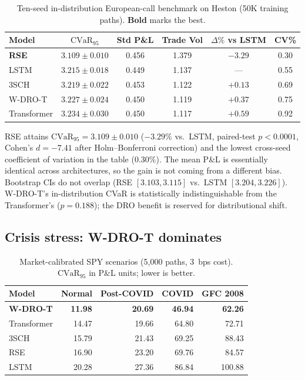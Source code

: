 \documentclass[11pt]{article}
\newcommand{\cvar}{\mathrm{CVaR}}
\begin{document}
\begin{table}[ht]\centering\small
\caption{Ten-seed in-distribution European-call benchmark on Heston (50K training paths). \textbf{Bold} marks the best.}
\label{tab:main}
\begin{tabular}{@{}lccccc@{}}
\toprule
\textbf{Model} & \textbf{$\cvar_{95}$} & \textbf{Std P\&L} & \textbf{Trade Vol} & \textbf{$\Delta\%$ vs LSTM} & \textbf{CV\%} \\\midrule
\textbf{RSE} & $\mathbf{3.109\pm 0.010}$ & 0.456 & 1.379 & $\mathbf{-3.29}$ & $\mathbf{0.30}$ \\
LSTM & $3.215\pm 0.018$ & 0.449 & 1.137 & --- & 0.55 \\
3SCH & $3.219\pm 0.022$ & 0.453 & 1.122 & $+0.13$ & 0.69 \\
W-DRO-T & $3.227\pm 0.024$ & 0.450 & 1.119 & $+0.37$ & 0.75 \\
Transformer & $3.234\pm 0.030$ & 0.450 & 1.117 & $+0.59$ & 0.92 \\
\bottomrule
\end{tabular}
\end{table}

RSE attains $\cvar_{95}=3.109\pm 0.010$ ($-3.29\%$ vs.\ LSTM, paired-test $p<0.0001$, Cohen's $d=-7.41$ after Holm--Bonferroni correction) and the lowest cross-seed coefficient of variation in the table ($0.30\%$).  The mean P\&L is essentially identical across architectures, so the gain is not coming from a different bias.  Bootstrap CIs do not overlap (RSE $[3.103,3.115]$ vs.\ LSTM $[3.204,3.226]$).  W-DRO-T's in-distribution CVaR is statistically indistinguishable from the Transformer's ($p=0.188$); the DRO benefit is reserved for distributional shift.

\subsection{Crisis stress: W-DRO-T dominates}

\begin{table}[ht]\centering\small
\caption{Market-calibrated SPY scenarios (5{,}000 paths, 3~bps cost). $\cvar_{95}$ in P\&L units; lower is better.}
\label{tab:spy}
\begin{tabular}{@{}lrrrr@{}}
\toprule
\textbf{Model} & \textbf{Normal} & \textbf{Post-COVID} & \textbf{COVID} & \textbf{GFC 2008} \\\midrule
\textbf{W-DRO-T} & \textbf{11.98} & \textbf{20.69} & \textbf{46.94} & \textbf{62.26} \\
Transformer      & 14.47 & 19.66 & 64.80 & 72.71 \\
3SCH             & 15.79 & 21.43 & 69.25 & 88.43 \\
RSE              & 16.90 & 23.20 & 69.76 & 84.57 \\
LSTM             & 20.28 & 27.36 & 86.84 & 100.88 \\
\bottomrule
\end{tabular}
\end{table}
\end{document}
